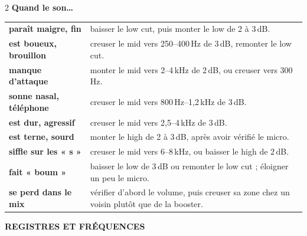 \documentclass[9pt]{extarticle}
\renewcommand\tabularxcolumn[1]{m{#1}}
\renewcommand{\arraystretch}{1}
\begin{document}
\begin{multicols}{2}
\textbf{Quand le son…}\par\vspace{1mm}
{\fontsize{8.6}{10.6}\selectfont
\renewcommand{\arraystretch}{1.12}\renewcommand\tabularxcolumn[1]{p{#1}}
\begin{tabularx}{\linewidth}{@{\hspace{4.5mm}}>{\bfseries}l X@{}}
paraît maigre, fin & baisser le low cut, puis monter le low de 2 à 3\,dB. \\
est boueux, brouillon & creuser le mid vers 250–400\,Hz de 3\,dB, remonter le low cut. \\
manque d'attaque & monter le mid vers 2–4\,kHz de 2\,dB, ou creuser vers 300\,Hz. \\
sonne nasal, téléphone & creuser le mid vers 800\,Hz–1,2\,kHz de 3\,dB. \\
est dur, agressif & creuser le mid vers 2,5–4\,kHz de 3\,dB. \\
est terne, sourd & monter le high de 2 à 3\,dB, après avoir vérifié le micro. \\
siffle sur les « s » & creuser le mid vers 6–8\,kHz, ou baisser le high de 2\,dB. \\
fait « boum » & baisser le low de 3\,dB ou remonter le low cut ; éloigner un peu le micro. \\
se perd dans le mix & vérifier d'abord le volume, puis creuser sa zone chez un voisin plutôt que de la booster. \\
\end{tabularx}}


\end{multicols}

\vfill
{\scriptsize\bfseries\color{encre!80}\MakeUppercase{Registres et fréquences}}

\vspace{0.5mm}
\end{document}
